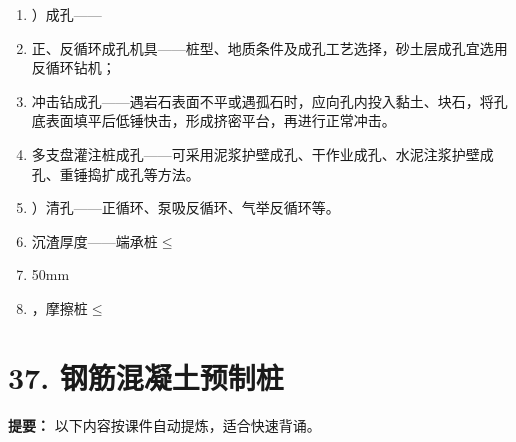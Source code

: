 \documentclass[UTF8,fontset=fandol,11pt]{ctexart}
\begin{document}
\begin{enumerate}[label=\arabic*.]
\item ）成孔——

\item 正、反循环成孔机具——桩型、地质条件及成孔工艺选择，砂土层成孔宜选用反循环钻机；

\item 冲击钻成孔——遇岩石表面不平或遇孤石时，应向孔内投入黏土、块石，将孔底表面填平后低锤快击，形成挤密平台，再进行正常冲击。

\item 多支盘灌注桩成孔——可采用泥浆护壁成孔、干作业成孔、水泥注浆护壁成孔、重锤捣扩成孔等方法。

\item ）清孔——正循环、泵吸反循环、气举反循环等。

\item 沉渣厚度——端承桩$\leq$

\item 50mm

\item ，摩擦桩$\leq$

\end{enumerate}

\newpage

\section*{37. 钢筋混凝土预制桩}


\begin{mainbox}

\textbf{提要：} 以下内容按课件自动提炼，适合快速背诵。

\end{mainbox}
\end{document}
